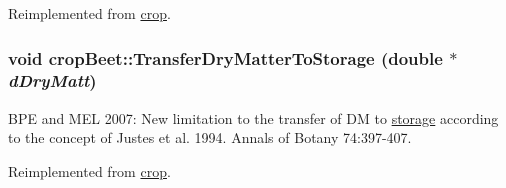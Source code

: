 Reimplemented from \hyperlink{classcrop_a8f2d5d0807fb0a81e50ea09e6df594ac}{crop}.\hypertarget{classcrop_beet_a6082dfaca5fc7cae98ec3fd5208d1380}{
\subsubsection[{TransferDryMatterToStorage}]{\setlength{\rightskip}{0pt plus 5cm}void cropBeet::TransferDryMatterToStorage (double $\ast$ {\em dDryMatt})}}
\label{classcrop_beet_a6082dfaca5fc7cae98ec3fd5208d1380}
BPE and MEL 2007: New limitation to the transfer of DM to \hyperlink{classstorage}{storage} according to the concept of Justes et al. 1994. Annals of Botany 74:397-\/407. 

Reimplemented from \hyperlink{classcrop_aa93103e69836afc4fb23c1a29b15584f}{crop}.

